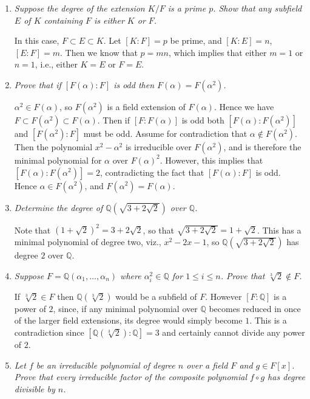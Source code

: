 \documentclass[10pt]{article}
\newcommand{\Q}{\mathbb{Q}}
\begin{document}
\begin{enumerate}
\item \emph{Suppose the degree of the extension $K/F$ is a prime $p$.  Show that any subfield $E$ of $K$ containing $F$ is either $K$ or $F$.}

In this case, $F \subset E \subset K$.  Let $[K:F] = p$ be prime, and $[K:E] = n$, $[E:F] = m$.  Then we know that $p = mn$, which implies that either $m=1$ or $n=1$, i.e., either $K = E$ or $F = E$.

\item \emph{Prove that if $[F(\alpha) : F]$ is odd then $F(\alpha) = F(\alpha^2)$.}

$\alpha^2 \in F(\alpha)$, so $F(\alpha^2)$ is a field extension of $F(\alpha)$.  Hence we have $F \subset F(\alpha^2) \subset F(\alpha)$.  Then if $[F:F(\alpha)]$ is odd both $[F(\alpha):F(\alpha^2)]$ and $[F(\alpha^2):F]$ must be odd.  Assume for contradiction that $\alpha \notin F(\alpha^2)$.  Then the polynomial $x^2 - \alpha^2$ is irreducible over $F(\alpha^2)$, and is therefore the minimal polynomial for $\alpha$ over $F(\alpha)^2$.  However, this implies that $[F(\alpha):F(\alpha^2)] = 2$, contradicting the fact that $[F(\alpha):F]$ is odd.  Hence $\alpha \in F(\alpha^2)$, and $F(\alpha^2) = F(\alpha)$.

\item \emph{Determine the degree of $\Q(\sqrt{3 + 2\sqrt{2}})$ over $\Q$.}

Note that $(1+\sqrt{2})^2 = 3 + 2\sqrt{2}$, so that $\sqrt{3 + 2\sqrt{2}} = 1 + \sqrt{2}$.  This has a minimal polynomial of degree two, viz., $x^2 - 2x - 1$, so $\Q(\sqrt{3 + 2\sqrt{2}})$ has degree $2$ over $\Q$.

\item \emph{Suppose $F = \Q(\alpha_1, \ldots, \alpha_n)$ where $\alpha_i^2 \in \Q$ for $1 \leq i \leq n$.  Prove that $\sqrt[3]{2} \notin F$.}

If $\sqrt[3]{2} \in F$ then $\Q(\sqrt[3]{2})$ would be a subfield of $F$.  However $[F:\Q]$ is a power of $2$, since, if any minimal polynomial over $\Q$ becomes reduced in once of the larger field extensions, its degree would simply become $1$.  This is a contradiction since $[\Q(\sqrt[3]{2}):\Q] = 3$ and certainly cannot divide any power of $2$.

\item \emph{Let $f$ be an irreducible polynomial of degree $n$ over a field $F$ and $g \in F[x]$.  Prove that every irreducible factor of the composite polynomial $f \circ g$ has degree divisible by $n$.}


\end{enumerate}
\end{document}
